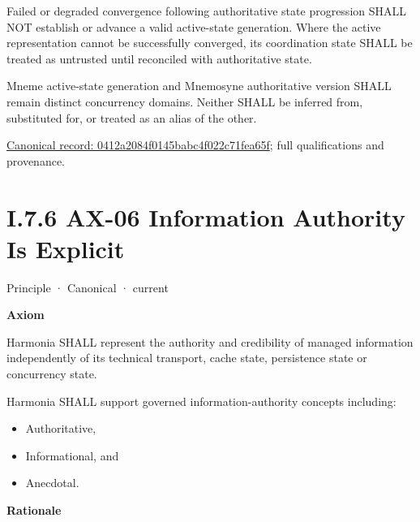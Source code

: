 Failed or degraded convergence following authoritative state progression SHALL NOT establish or advance a valid active-state generation. Where the active representation cannot be successfully converged, its coordination state SHALL be treated as untrusted until reconciled with authoritative state.



Mneme active-state generation and Mnemosyne authoritative version SHALL remain distinct concurrency domains. Neither SHALL be inferred from, substituted for, or treated as an alias of the other.


{\footnotesize \href{../../../../continuum/motivation/principle/0412a2084f0145babc4f022c71fea65f.md}{Canonical record: 0412a2084f0145babc4f022c71fea65f}; full qualifications and provenance.}\par
\section*{I.7.6 AX-06 Information Authority Is Explicit}
\label{navigation:I.7.6}

\label{element:952c3b6148ce4fce94b69f99a0c2fec7}
{\small Principle · Canonical · current}\par

\par\medskip\textbf{Axiom}\par


Harmonia SHALL represent the authority and credibility of managed
information independently of its technical transport, cache state,
persistence state or concurrency state.



Harmonia SHALL support governed information-authority concepts including:



\begin{itemize}


\item Authoritative,

\item Informational, and

\item Anecdotal.

\end{itemize}


\par\medskip\textbf{Rationale}\par


